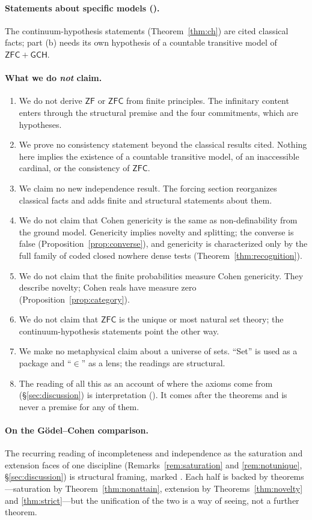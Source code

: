 \paragraph{Statements about specific models (\modelg).} The continuum-hypothesis statements
(Theorem~\ref{thm:ch}) are cited classical facts; part (b) needs its own hypothesis of a countable
transitive model of $\mathsf{ZFC}+\mathsf{GCH}$.

\paragraph{What we do \emph{not} claim.}
\begin{enumerate}\itemsep1pt
  \item We do not derive $\mathsf{ZF}$ or $\mathsf{ZFC}$ from finite principles. The infinitary
  content enters through the structural premise and the four commitments, which are hypotheses.
  \item We prove no consistency statement beyond the classical results cited. Nothing here
  implies the existence of a countable transitive model, of an inaccessible cardinal, or the
  consistency of $\mathsf{ZFC}$.
  \item We claim no new independence result. The forcing section reorganizes classical facts and
  adds finite and structural statements about them.
  \item We do not claim that Cohen genericity is the same as non-definability from the ground
  model. Genericity implies novelty and splitting; the converse is false
  (Proposition~\ref{prop:converse}), and genericity is characterized only by the full family of
  coded closed nowhere dense tests (Theorem~\ref{thm:recognition}).
  \item We do not claim that the finite probabilities measure Cohen genericity. They describe
  novelty; Cohen reals have measure zero (Proposition~\ref{prop:category}).
  \item We do not claim that $\mathsf{ZFC}$ is the unique or most natural set theory; the
  continuum-hypothesis statements point the other way.
  \item We make no metaphysical claim about a universe of sets. ``Set'' is used as a package and
  ``$\in$'' as a lens; the readings are structural.
  \item The reading of all this as an account of where the axioms come from
  (\S\ref{sec:discussion}) is interpretation (\metag). It comes after the theorems and is never a
  premise for any of them.
\end{enumerate}

\paragraph{On the G\"odel--Cohen comparison.} The recurring reading of incompleteness and
independence as the saturation and extension faces of one discipline
(Remarks~\ref{rem:saturation} and \ref{rem:notunique}, \S\ref{sec:discussion}) is structural
framing, marked \metag. Each half is backed by theorems---saturation by
Theorem~\ref{thm:nonattain}, extension by Theorems~\ref{thm:novelty} and \ref{thm:strict}---but
the unification of the two is a way of seeing, not a further theorem.
